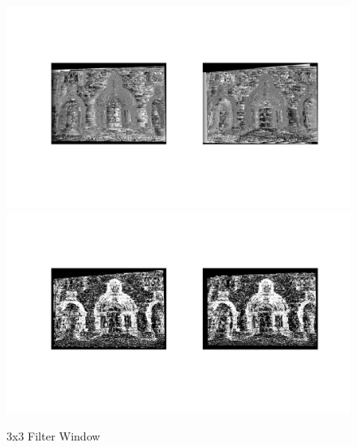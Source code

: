 \documentclass[12pt]{article}
\begin{document}
\vspace{5mm}
\begin{figure}[H]
	\centering
	\includegraphics[width=1.1\textwidth]{dc3_1.jpg}
	\includegraphics[width=1.1\textwidth]{dc3_2.jpg}
	\caption{3x3 Filter Window}
	\label{fig1}
\end{figure}
\vspace{5mm}
\end{document}
